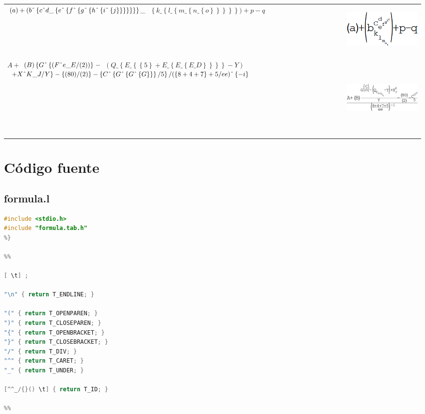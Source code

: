 \documentclass[a4paper, 10pt, twoside]{article}
\begin{document}
\begin{adjustwidth}{-4em}{}
\begin{tabular}{>{\centering\arraybackslash}m{3in} c}
\\
\large\( (a)+(b \string^ \left\{c \string^ d \_ \left\{e \string^ \left\{f \string^ \left\{g \string^ \left\{h \string^ \left\{i \string^ \left\{j\right\}\right\}\right\}\right\}\right\}\right\}\right\} \_ \) \( \left\{k \_ \left\{l \_ \left\{m \_ \left\{n \_ \left\{o\right\}\right\}\right\}\right\}\right\})+p-q \) \vfill & \includegraphics[height=7em]{images/parenmountains.png} \\
\\
\large\(A+\) \((B)\left\{G\string^\left\{(F\string^e\_E/(2))\right\}\right.- \) \(\left.(Q\_\left\{E\_\left\{\left\{5\right\}+E\_\left\{E\_\left\{E\_D\right\}\right\}\right\}\right\}-Y)\right.\) \(\left.+X\string^K\_J/Y\right\}-\left\{(80)/(2)\right\}-\left\{C\string^\left\{G\string^\left\{G\string^\left\{G\right\}\right\}\right\}/5\right\}/(\left\{8+4+7\right\}+5/ee)\string^\left\{-i\right\}\) \vfill & \includegraphics[height=11em]{images/christian.png} \\
\end{tabular}
\end{adjustwidth}

\section{C\'odigo fuente}

\subsection{formula.l}

\begin{lstlisting}[language=C]
%{
#include <stdio.h>
#include "formula.tab.h"
%}

%%

[ \t] ;

"\n" { return T_ENDLINE; }

"(" { return T_OPENPAREN; }
")" { return T_CLOSEPAREN; }
"{" { return T_OPENBRACKET; }
"}" { return T_CLOSEBRACKET; }
"/" { return T_DIV; }
"^" { return T_CARET; }
"_" { return T_UNDER; }

[^^_/{}() \t] { return T_ID; }

%%
\end{lstlisting}
\end{document}
